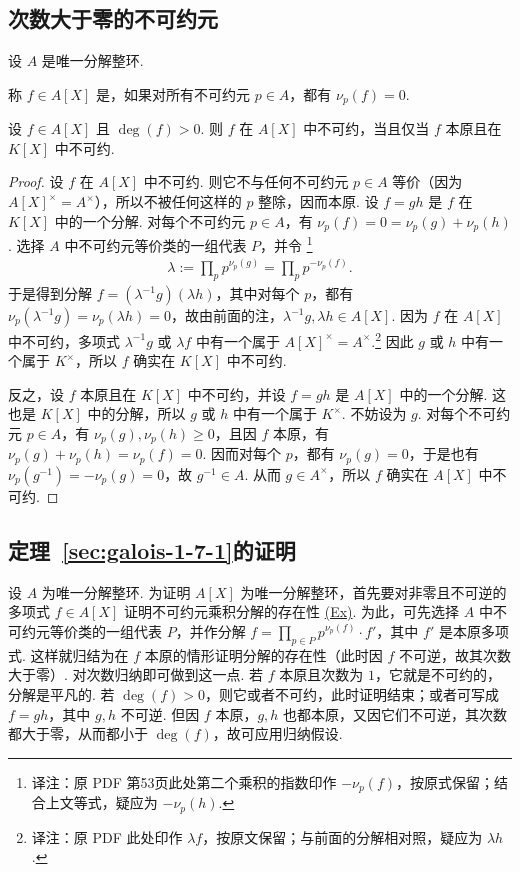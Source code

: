 \subsection{次数大于零的不可约元}\label{sec:galois-1-7-3}
设 $A$ 是唯一分解整环.
\begin{definition*}
称 $f\in A[X]$ 是，如果对所有不可约元 $p\in A$，都有 $\nu_p(f)=0$.
\end{definition*}
\begin{proposition*}
设 $f\in A[X]$ 且 $\deg(f)>0$. 则 $f$ 在 $A[X]$ 中不可约，当且仅当 $f$ 本原且在 $K[X]$ 中不可约.
\end{proposition*}
\begin{proof}
设 $f$ 在 $A[X]$ 中不可约. 则它不与任何不可约元 $p\in A$ 等价（因为 $A[X]^\times=A^\times$），所以不被任何这样的 $p$ 整除，因而本原. 设 $f=gh$ 是 $f$ 在 $K[X]$ 中的一个分解. 对每个不可约元 $p\in A$，有 $\nu_p(f)=0=\nu_p(g)+\nu_p(h)$. 选择 $A$ 中不可约元等价类的一组代表 $P$，并令
\footnote{译注：原 PDF 第53页此处第二个乘积的指数印作 $-\nu_p(f)$，按原式保留；结合上文等式，疑应为 $-\nu_p(h)$.}
\begin{align*}
\lambda:=\prod_p p^{\nu_p(g)}=\prod_p p^{-\nu_p(f)}.
\end{align*}
于是得到分解 $f=(\lambda^{-1}g)(\lambda h)$，其中对每个 $p$，都有 $\nu_p(\lambda^{-1}g)=\nu_p(\lambda h)=0$，故由前面的注，$\lambda^{-1}g,\lambda h\in A[X]$. 因为 $f$ 在 $A[X]$ 中不可约，多项式 $\lambda^{-1}g$ 或 $\lambda f$ 中有一个属于 $A[X]^\times=A^\times$.\footnote{译注：原 PDF 此处印作 $\lambda f$，按原文保留；与前面的分解相对照，疑应为 $\lambda h$.} 因此 $g$ 或 $h$ 中有一个属于 $K^\times$，所以 $f$ 确实在 $K[X]$ 中不可约.

反之，设 $f$ 本原且在 $K[X]$ 中不可约，并设 $f=gh$ 是 $A[X]$ 中的一个分解. 这也是 $K[X]$ 中的分解，所以 $g$ 或 $h$ 中有一个属于 $K^\times$. 不妨设为 $g$. 对每个不可约元 $p\in A$，有 $\nu_p(g),\nu_p(h)\geqslant0$，且因 $f$ 本原，有 $\nu_p(g)+\nu_p(h)=\nu_p(f)=0$. 因而对每个 $p$，都有 $\nu_p(g)=0$，于是也有 $\nu_p(g^{-1})=-\nu_p(g)=0$，故 $g^{-1}\in A$. 从而 $g\in A^\times$，所以 $f$ 确实在 $A[X]$ 中不可约.
\end{proof}
\subsection{定理~\ref{sec:galois-1-7-1}的证明}\label{sec:galois-1-7-4}
设 $A$ 为唯一分解整环. 为证明 $A[X]$ 为唯一分解整环，首先要对非零且不可逆的多项式 $f\in A[X]$ 证明不可约元乘积分解的存在性 \hyperlink{galois-factorization-ex}{(Ex)}. 为此，可先选择 $A$ 中不可约元等价类的一组代表 $P$，并作分解 $f=\prod_{p\in P}p^{\nu_p(f)}\cdot f'$，其中 $f'$ 是本原多项式. 这样就归结为在 $f$ 本原的情形证明分解的存在性（此时因 $f$ 不可逆，故其次数大于零）. 对次数归纳即可做到这一点. 若 $f$ 本原且次数为 $1$，它就是不可约的，分解是平凡的. 若 $\deg(f)>0$，则它或者不可约，此时证明结束；或者可写成 $f=gh$，其中 $g,h$ 不可逆. 但因 $f$ 本原，$g,h$ 也都本原，又因它们不可逆，其次数都大于零，从而都小于 $\deg(f)$，故可应用归纳假设.

